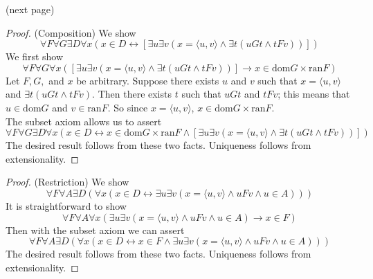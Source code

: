 \documentclass{report}
\begin{document}
\noindent(next page)\newpage
\begin{proof}(Composition) We show
\begin{equation*}
\forall F\forall G\exists D\forall x(x\in D\leftrightarrow[\exists u\exists v(x=\langle u,v\rangle\land\exists t(uGt\land tFv))])
\end{equation*}
We first show
\begin{equation*}
\forall F\forall G\forall x([\exists u\exists v(x=\langle u,v\rangle\land\exists t(uGt\land tFv))]\to x\in\text{dom}G\times\text{ran}F)
\end{equation*}
Let $F,G,$ and $x$ be arbitrary. Suppose there exists $u$ and $v$ such that $x=\langle u,v\rangle$ and $\exists t(uGt\land tFv)$. Then there exists $t$ such that $uGt$ and $tFv$; this means that
$u\in\text{dom}G$ and $v\in\text{ran}F$. So since $x=\langle u,v\rangle$, $x\in\text{dom}G\times\text{ran}F$.\\
\indent The subset axiom allows us to assert
\begin{equation*}
\forall F\forall G\exists D\forall x(x\in D\leftrightarrow x\in\text{dom}G\times\text{ran}F\land[\exists u\exists v(x=\langle u,v\rangle\land\exists t(uGt\land tFv))])
\end{equation*}
The desired result follows from these two facts. Uniqueness follows from extensionality.
\end{proof}
\begin{proof}(Restriction) We show
\begin{equation*}
\forall F\forall A\exists D(\forall x(x\in D\leftrightarrow\exists u\exists v(x=\langle u,v\rangle\land uFv\land u\in A)))
\end{equation*}
It is straightforward to show
\begin{equation*}
\forall F\forall A\forall x(\exists u\exists v(x=\langle u,v\rangle\land uFv\land u\in A)\to x\in F)
\end{equation*}
Then with the subset axiom we can assert
\begin{equation*}
\forall F\forall A\exists D(\forall x(x\in D\leftrightarrow x\in F\land\exists u\exists v(x=\langle u,v\rangle\land uFv\land u\in A)))
\end{equation*}
The desired result follows from these two facts. Uniqueness follows from extensionality.
\end{proof}
\end{document}
